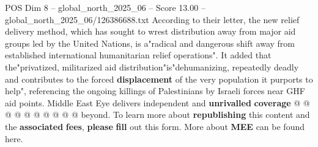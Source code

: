 \begin{textsample}{POS Dim 8 – global\_north\_2025\_06 – Score 13.00 – global\_north\_2025\_06/126386688.txt}
According to their letter, the new relief delivery method, which has sought to wrest distribution away from major aid groups led by the United Nations, is a"radical and dangerous shift away from established international humanitarian relief operations".
It added that the"privatized, militarized aid distribution"is"dehumanizing, repeatedly deadly and contributes to the forced \textbf{displacement} of the very population it purports to help", referencing the ongoing killings of Palestinians by Israeli forces near GHF aid points.
Middle East Eye delivers independent and \textbf{unrivalled} \textbf{coverage} @ @ @ @ @ @ @ @ @ @ beyond.
To learn more about \textbf{republishing} this content and the \textbf{associated} \textbf{fees}, \textbf{please} \textbf{fill} out this form.
More about \textbf{MEE} can be found here.

\end{textsample}
